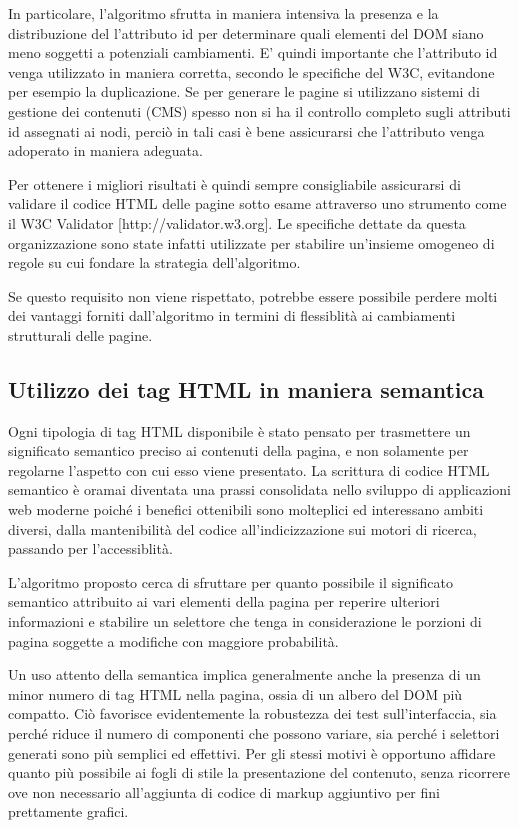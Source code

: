 \documentclass[12pt]{toptesi}
\begin{document}
In particolare, l'algoritmo sfrutta in maniera intensiva la presenza e la distribuzione del l'attributo id per determinare quali elementi del DOM siano meno soggetti a potenziali cambiamenti. E' quindi importante che l'attributo id venga utilizzato in maniera corretta, secondo le specifiche del W3C, evitandone per esempio la duplicazione. Se per generare le pagine si utilizzano sistemi di gestione dei contenuti (CMS) spesso non si ha il controllo completo sugli attributi id assegnati ai nodi, perciò in tali casi è bene assicurarsi che l'attributo venga adoperato in maniera adeguata.

Per ottenere i migliori risultati è quindi sempre consigliabile assicurarsi di validare il codice HTML delle pagine sotto esame attraverso uno strumento come il W3C Validator [http://validator.w3.org]. Le specifiche dettate da questa organizzazione sono state infatti utilizzate per stabilire un'insieme omogeneo di regole su cui fondare la strategia dell'algoritmo.

Se questo requisito non viene rispettato, potrebbe essere possibile perdere molti dei vantaggi forniti dall'algoritmo in termini di flessiblità ai cambiamenti strutturali delle pagine.

\subsection {Utilizzo dei tag HTML in maniera semantica}

Ogni tipologia di tag HTML disponibile è stato pensato per trasmettere un significato semantico preciso ai contenuti della pagina, e non solamente per regolarne l'aspetto con cui esso viene presentato. La scrittura di codice HTML semantico è oramai diventata una prassi consolidata nello sviluppo di applicazioni web moderne poiché i benefici ottenibili sono molteplici ed interessano ambiti diversi, dalla mantenibilità del codice all'indicizzazione sui motori di ricerca, passando per l'accessiblità.

L'algoritmo proposto cerca di sfruttare per quanto possibile il significato semantico attribuito ai vari elementi della pagina per reperire ulteriori informazioni e stabilire un selettore che tenga in considerazione le porzioni di pagina soggette a modifiche con maggiore probabilità.

Un uso attento della semantica implica generalmente anche la presenza di un minor numero di tag HTML nella pagina, ossia di un albero del DOM più compatto. Ciò favorisce evidentemente la robustezza dei test sull'interfaccia, sia perché riduce il numero di componenti che possono variare, sia perché i selettori generati sono più semplici ed effettivi. Per gli stessi motivi è opportuno affidare quanto più possibile ai fogli di stile la presentazione del contenuto, senza ricorrere ove non necessario all'aggiunta di codice di markup aggiuntivo per fini prettamente grafici.
\end{document}
